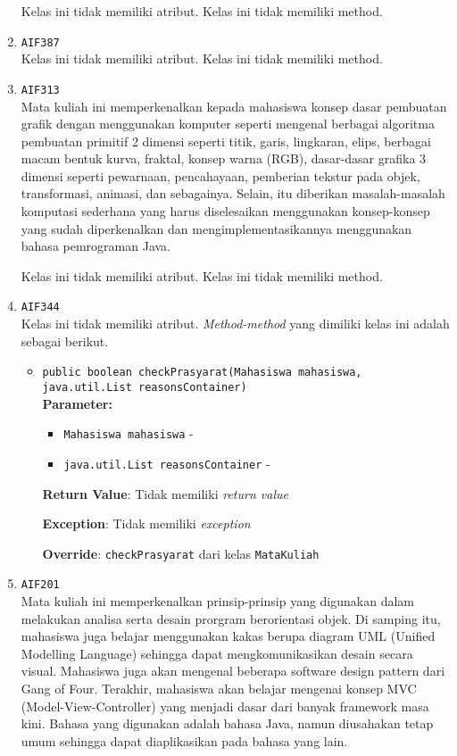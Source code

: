 \documentclass{article}
\begin{document}
\begin{enumerate}
Kelas ini tidak memiliki atribut. Kelas ini tidak memiliki method. \item \texttt{AIF387}\\ 


Kelas ini tidak memiliki atribut. Kelas ini tidak memiliki method. \item \texttt{AIF313}\\ 
Mata kuliah ini memperkenalkan kepada mahasiswa konsep dasar pembuatan grafik
 dengan menggunakan komputer seperti mengenal berbagai algoritma pembuatan
 primitif 2 dimensi seperti titik, garis, lingkaran, elips, berbagai macam
 bentuk kurva, fraktal, konsep warna (RGB), dasar-dasar grafika 3 dimensi
 seperti pewarnaan, pencahayaan, pemberian tekstur pada objek, transformasi,
 animasi, dan sebagainya. Selain, itu diberikan masalah-masalah komputasi
 sederhana yang harus diselesaikan menggunakan konsep-konsep yang sudah
 diperkenalkan dan mengimplementasikannya menggunakan bahasa pemrograman Java.

Kelas ini tidak memiliki atribut. Kelas ini tidak memiliki method. \item \texttt{AIF344}\\ 


Kelas ini tidak memiliki atribut. \textit{Method-method} yang dimiliki kelas ini adalah sebagai berikut.
\begin{itemize}
\item \texttt{public boolean checkPrasyarat(Mahasiswa mahasiswa, java.util.List reasonsContainer)}\\ 


\textbf{Parameter:}\begin{itemize}
\item \texttt{Mahasiswa mahasiswa} - 
\item \texttt{java.util.List reasonsContainer} - 
\end{itemize}
\textbf{Return Value}: Tidak memiliki \textit{return value}

\textbf{Exception}: Tidak memiliki \textit{exception}

\textbf{Override}: \texttt{checkPrasyarat} dari kelas \texttt{MataKuliah}

\end{itemize}
\item \texttt{AIF201}\\ 
Mata kuliah ini memperkenalkan prinsip-prinsip yang digunakan dalam 
 melakukan analisa serta desain prorgram berorientasi objek. Di samping itu, 
 mahasiswa juga belajar menggunakan kakas berupa diagram UML (Unified 
 Modelling Language) sehingga dapat mengkomunikasikan desain secara visual. 
 Mahasiswa juga akan mengenal beberapa software design pattern dari Gang of 
 Four. Terakhir, mahasiswa akan belajar mengenai konsep MVC 
 (Model-View-Controller) yang menjadi dasar dari banyak framework masa kini.
 Bahasa yang digunakan adalah bahasa Java, namun diusahakan tetap umum 
 sehingga dapat diaplikasikan pada bahasa yang lain.


\end{enumerate}
\end{document}
